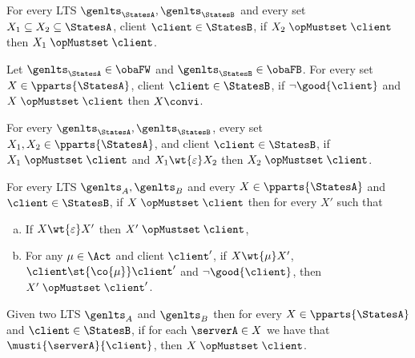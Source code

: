 \begin{lemma}
  \label{lem:mx-sub}
  For every LTS  $\genlts_\StatesA, \genlts_\StatesB$ and
  every set $X_1 \subseteq X_2 \subseteq \StatesA$, client $\client \in \StatesB$,
  if $\mustset{X_2}{\client}$ %
  then $\mustset{X_1}{\client}$.
\end{lemma}

\begin{lemma}
  \label{lem:mustx-terminate-ungood}
  Let $\genlts_\StatesA \in \obaFW$ and $\genlts_\StatesB \in \obaFB$.
  For every set $X \in \pparts{ \StatesA }$, client $\client \in \StatesB$,
  if $\lnot \good{\client}$ and $ \mustset{X}{\client}$ then $X \convi$.
\end{lemma}

\begin{lemma}
  \label{lem:wt-nil-mx}
  For every $\genlts_\StatesA, \genlts_\StatesB$,
  every set $X_1, X_2 \in \pparts{\StatesA}$, and client $\client \in \StatesB$,
  if $\mustset{X_1}{\client}$ and $X_1 \wt{\varepsilon} X_2$ then $\mustset{X_2}{\client}$.
\end{lemma}

\begin{lemma}
  \label{lem:mx-preservation}
  For every LTS $\genlts_A, \genlts_B$ and every
  $X \in \pparts{\StatesA}$ and $\client \in \StatesB$,
  if $\mustset{X}{\client}$ then for every $X'$ such that
  \begin{enumerate}[(a)]
  \item\label{pt:mx-preservation-wt-nil}
    If $X \wt{\varepsilon} X'$ then $\mustset{X'}{\client}$,
  \item\label{pt:mx-preservation-wt-mu}
    For any $\mu \in \Act$ and client $\client'$,
    if $X \wt{\mu} X'$, $\client \st{\co{\mu}} \client'$ and $\lnot \good{\client}$,
    then $\mustset{X'}{\client'}$.
  \end{enumerate}
\end{lemma}



\begin{lemma}
  \label{lem:mx-forall}
  Given two LTS $\genlts_A$ and $\genlts_B$ then for every
  $X \in \pparts{\StatesA}$ and $\client \in \StatesB$,
  if for each $\serverA \in X$ we have that $\musti{\serverA}{\client}$,
  then $\mustset{X}{\client}$.
\end{lemma}



